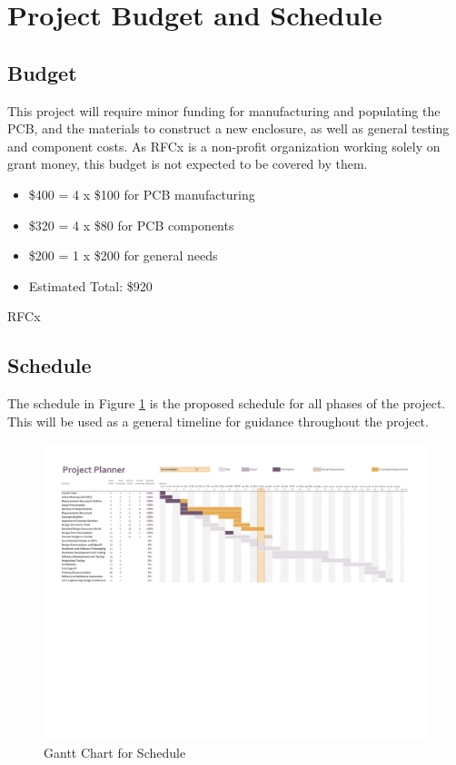 \documentclass{article}
\numberwithin{figure}{section}
\numberwithin{equation}{section}
\begin{document}
{\section{Project Budget and Schedule} \label{sect:budgetandschedule}
\subsection{Budget} \label{sect:budget}
This project will require minor funding for manufacturing and populating the PCB, and the materials to construct a new enclosure, as well as general testing and component costs. As RFCx is a non-profit organization working solely on grant money, this budget is not expected to be covered by them.
\begin{itemize}
\item \$400 = 4 x \$100 for PCB manufacturing
\item \$320 = 4 x \$80 for PCB components
\item \$200 = 1 x \$200 for general needs
\item Estimated Total: \$920
\end{itemize}

RFCx

\begin{landscape}
\subsection{Schedule} \label{sect:schedule}
The schedule in Figure \ref{fig:gantt} is the proposed schedule for all phases of the project. This will be used as a general timeline for guidance throughout the project.

\begin{figure}[H]
  \centering
  \includegraphics[scale=0.85, trim=0cm 12cm 0cm 0cm, clip=true]{Schedule.pdf}
  \caption{Gantt Chart for Schedule}
  \label{fig:gantt}
\end{figure}
\end{landscape}

}
\end{document}

